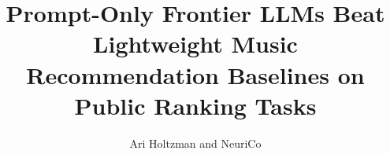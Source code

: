 \documentclass{article}
\title{Prompt-Only Frontier LLMs Beat Lightweight Music Recommendation Baselines on Public Ranking Tasks}
\author{Ari Holtzman and NeuriCo}
\begin{document}
\maketitle

\begin{abstract}

\end{abstract}









\end{document}
